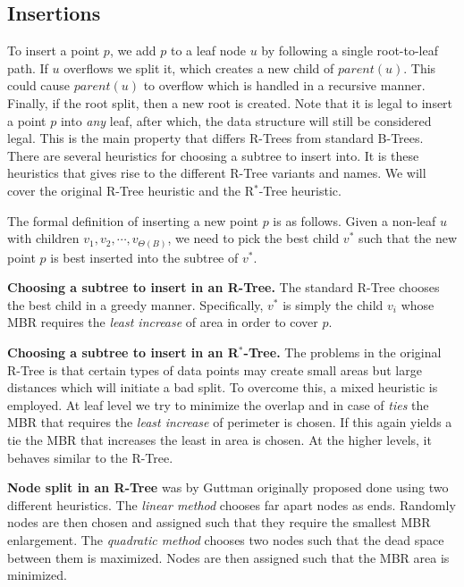 \documentclass[twoside,11pt,openright]{report}
\begin{document}
\subsection{Insertions}
To insert a point $p$, we add $p$ to a leaf node $u$ by following a single root-to-leaf path. If $u$ overflows we split it, which creates a new child of $parent(u)$. This could cause $parent(u)$ to overflow which is handled in a recursive manner. Finally, if the root split, then a new root is created. Note that it is legal to insert a point $p$ into \textit{any} leaf, after which, the data structure will still be considered legal. This is the main property that differs R-Trees from standard B-Trees. There are several heuristics for choosing a subtree to insert into. It is these heuristics that gives rise to the different R-Tree variants and names. We will cover the original R-Tree heuristic and the R$^*$-Tree heuristic.

The formal definition of inserting a new point $p$ is as follows. Given a non-leaf $u$ with children $v_1, v_2, \cdots, v_{\Theta(B)}$, we need to pick the best child $v^*$ such that the new point $p$ is best inserted into the subtree of $v^*$.

\textbf{Choosing a subtree to insert in an R-Tree.}  The standard R-Tree chooses the best child in a greedy manner. Specifically, $v^*$ is simply the child $v_i$ whose MBR requires the \textit{least increase} of area in order to cover $p$.

\textbf{Choosing a subtree to insert in an R$^*$-Tree.} The problems in the original R-Tree is that certain types of data points may create small areas but large distances which will initiate a bad split. To overcome this, a mixed heuristic is employed. At leaf level we try to minimize the overlap and in case of \textit{ties} the MBR that requires the \textit{least increase} of perimeter is chosen. If this again yields a tie the MBR that increases the least in area is chosen. At the higher levels, it behaves similar to the R-Tree.

\textbf{Node split in an R-Tree} was by Guttman originally proposed done using two different heuristics. The \textit{linear method} chooses far apart nodes as ends. Randomly nodes are then chosen and assigned such that they require the smallest MBR enlargement. The \textit{quadratic method} chooses two nodes such that the dead space between them is maximized. Nodes are then assigned such that the MBR area is minimized.
\end{document}
